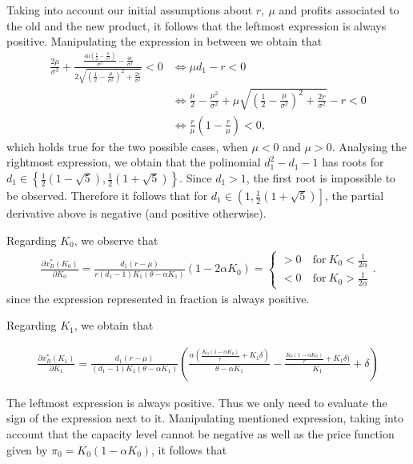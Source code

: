Taking into account our initial assumptions about $r, \ \mu$ and profits associated to the old and the new product, it follows that the leftmost expression is always positive. Manipulating the expression in between we obtain that
\begin{align}
\frac{2 \mu }{\sigma ^3}+\frac{\frac{4 \mu  \left(\frac{1}{2}-\frac{\mu }{\sigma ^2}\right)}{\sigma ^3}-\frac{4 r}{\sigma ^3}}{2 \sqrt{\left(\frac{1}{2}-\frac{\mu }{\sigma ^2}\right)^2+\frac{2 r}{\sigma ^2}}}<0  &\Leftrightarrow  \mu d_1-r<0 \nonumber \\
&\Leftrightarrow \frac{\mu}{2}-\frac{\mu^2}{\sigma^2}+\mu \sqrt{\left( \frac{1}{2}-\frac{\mu}{\sigma^2}\right)^2+\frac{2r}{\sigma^2}}-r<0 \nonumber \\
&\Leftrightarrow \frac{r}{\mu}\left(1-\frac{r}{\mu} \right) <0 \label{mud1-r},
\end{align}
which holds true for the two possible cases, when $\mu<0$ and $\mu>0$.
Analysing the rightmost expression, we obtain that the polinomial $d_1^2-d_1-1$ has roots for $d_1 \in \left\{\frac{1}{2} (1-\sqrt{5}),\frac{1}{2} (1+\sqrt{5}) \right\}$. Since $d_1>1$, the first root is impossible to be observed. Therefore it follows that for $d_1 \in \left(1,\frac{1}{2} (1+\sqrt{5}) \right]$, the partial derivative above is negative (and positive otherwise).

Regarding $K_0$, we observe that
\begin{align*}
\frac{\partial x^*_B ( K_0 ) }{\partial K_0}= 
\frac{d_1 (r-\mu )}{r (d_1-1)K_1(\theta-\alpha K_1)} (1-2\alpha K_0)
=
\begin{cases}
>0 &\ \text{for} \ K_0<\frac{1}{2 \alpha}\\
<0 &\ \text{for} \ K_0>\frac{1}{2 \alpha}
\end{cases}.
\end{align*}
since the expression represented in fraction is always positive.


Regarding $K_1$, we obtain that

\begin{align*}
\frac{\partial x^*_B ( K_1 ) }{\partial K_1}= 
\frac{d_1 (r-\mu )}{ (d_1-1)K_1(\theta-\alpha K_1)}  \left( \frac{\alpha (\frac{K_0(1-\alpha K_0)}{r}+K_1 \delta )}{\theta-\alpha K_1} -\frac{ \frac{K_0(1-\alpha K_0)}{r}+K_1 \delta )}{K_1}+ \delta \right)
\end{align*}


The leftmost expression is always positive. Thus we only need to evaluate the sign of the expression next to it. Manipulating mentioned expression, taking into account that the capacity level cannot be negative as well as the price function given by $\pi_0=K_0(1-\alpha K_0)$, it follows that

